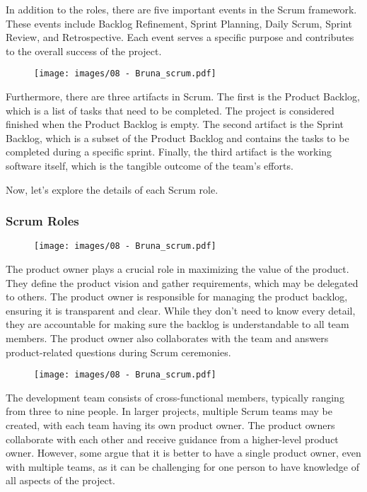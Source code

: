 In addition to the roles, there are five important events in the Scrum
framework. These events include Backlog Refinement, Sprint Planning,
Daily Scrum, Sprint Review, and Retrospective. Each event serves a
specific purpose and contributes to the overall success of the project.

\begin{figure}[!h]
  \centering
  \texttt{[image: images/08 - Bruna\_scrum.pdf]}
\end{figure}

Furthermore, there are three artifacts in Scrum. The first is the
Product Backlog, which is a list of tasks that need to be completed. The
project is considered finished when the Product Backlog is empty. The
second artifact is the Sprint Backlog, which is a subset of the Product
Backlog and contains the tasks to be completed during a specific sprint.
Finally, the third artifact is the working software itself, which is the
tangible outcome of the team's efforts.

Now, let's explore the details of each Scrum role.

\subsubsection{Scrum Roles}

\begin{figure}[!h]
  \centering
  \texttt{[image: images/08 - Bruna\_scrum.pdf]}
\end{figure}

The product owner plays a crucial role in maximizing the value of the
product. They define the product vision and gather requirements, which
may be delegated to others. The product owner is responsible for
managing the product backlog, ensuring it is transparent and clear.
While they don't need to know every detail, they are accountable for
making sure the backlog is understandable to all team members. The
product owner also collaborates with the team and answers
product-related questions during Scrum ceremonies.

\begin{figure}[!h]
  \centering
  \texttt{[image: images/08 - Bruna\_scrum.pdf]}
\end{figure}

The development team consists of cross-functional members, typically
ranging from three to nine people. In larger projects, multiple Scrum
teams may be created, with each team having its own product owner. The
product owners collaborate with each other and receive guidance from a
higher-level product owner. However, some argue that it is better to
have a single product owner, even with multiple teams, as it can be
challenging for one person to have knowledge of all aspects of the
project.

